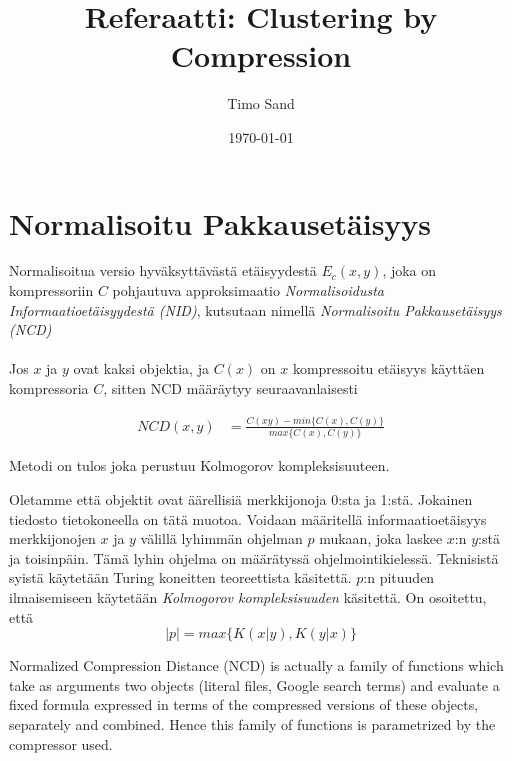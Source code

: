 \documentclass[finnish]{tktltiki2}
\title{Referaatti: Clustering by Compression}
\author{Timo Sand}
\date{\today}
\theoremstyle{definition}
\theoremstyle{remark}
\begin{document}

\frontmatter      %

\maketitle        %



\mainmatter       %

\section{Normalisoitu Pakkausetäisyys}

  Normalisoitua versio hyväksyttävästä etäisyydestä $E_c(x,y)$, joka on kompressoriin $C$ pohjautuva approksimaatio \emph{Normalisoidusta Informaatioetäisyydestä (NID)}, kutsutaan nimellä \emph{Normalisoitu Pakkausetäisyys (NCD)} \cite{CV05}
\\\\
  Jos $x$ ja $y$ ovat kaksi objektia, ja $C(x)$ on $x$ kompressoitu etäisyys  käyttäen kompressoria $C$, sitten NCD määräytyy seuraavanlaisesti

  \begin{align*}
    NCD(x,y) &= \frac{C(xy)-min\{C(x),C(y)\}}{max\{C(x),C(y)\}}
  \end{align*}

  Metodi on tulos joka perustuu Kolmogorov kompleksisuuteen.

  Oletamme että objektit ovat äärellisiä merkkijonoja 0:sta ja 1:stä. Jokainen tiedosto tietokoneella on tätä muotoa. Voidaan määritellä informaatioetäisyys merkkijonojen $x$ ja $y$ välillä lyhimmän ohjelman $p$ mukaan, joka laskee $x$:n $y$:stä ja toisinpäin. Tämä lyhin ohjelma on määrätyssä ohjelmointikielessä. Teknisistä syistä käytetään Turing koneitten teoreettista käsitettä.
  $p$:n pituuden ilmaisemiseen käytetään \emph{Kolmogorov kompleksisuuden} käsitettä. On osoitettu, että
  $$|p| = max\{K(x|y),K(y|x)\}$$


  Normalized Compression Distance (NCD) is actually a family of functions which take as arguments two objects (literal files, Google search terms) and evaluate a fixed formula expressed in terms of the compressed versions of these objects, separately and combined. Hence this family of functions is parametrized by the compressor used.
\end{document}
